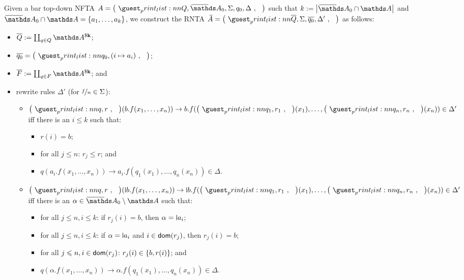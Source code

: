 \documentclass[a4paper,UKenglish,cleveref,autoref,thm-restate,numberwithinsect,final]{lipics-v2021}
\begin{document}
    \begin{construction}\label{constr:RNTA}
      \sloppypar
      Given a bar top-down NFTA $A = \maketuple{Q, \barNames_0, \Sigma, q_0, \Delta}$ such that
      ${k := \card{\barNames_0 \cap \names}}$ and $\barNames_0 \cap \names = \set{a_1, \dots, a_k}$,
      we construct the RNTA $\barA = \maketuple{\overline{Q}, \Sigma, \overline{q_0}, \Delta'}$
      as follows:
      \begin{itemize}
        \item $\overline{Q} := \coprod_{q \in Q} \parnom{k}$;
        \item $\overline{q_0} = \maketuple{q_0, (i \mapsto a_i)}$;
        \item $\overline{F} := \coprod_{q \in F} \parnom{k}$; and
        \item rewrite rules $\Delta'$ (for $\nicefrac{f}{n} \in \Sigma$):
        \begin{itemize}
          \item $\maketuple{q,r}(b.f(x_1, \dots, x_n)) \to b.f(\maketuple{q_1,r_1}(x_1),\dots,\maketuple{q_n,r_n}(x_n))
            \in \Delta'$ iff there is an $i \leqslant k$ such that:
            \begin{itemize}
              \item $r(i) = b$;\label{RNTA:cond:1:a}
              \item for all $j \leqslant n$: $r_j \leqslant r$; and\label{RNTA:cond:1:b}
              \item $q(a_i.f(x_1, \dots, x_n)) \to a_i.f(q_1(x_1), \dots, q_n(x_n)) \in \Delta$.\label{RNTA:cond:1:c}
            \end{itemize}
          \item $\maketuple{q,r}(\newletter{b}.f(x_1, \dots, x_n)) \to \newletter{b}.f(\maketuple{q_1,r_1}(x_1),\dots,
            \maketuple{q_n,r_n}(x_n)) \in \Delta'$ iff
            there is an $\alpha \in \barNames_0\setminus\names$ such that: 
            \begin{itemize}
              \item for all $j \leqslant n, i \leqslant k$: if $r_j(i) = b$, then $\alpha = \newletter{a_i}$;
                \label{RNTA:cond:2:a}
              \item for all $j \leqslant n, i \leqslant k$: if $\alpha = \newletter{a_i}$ and $i \in \operatorname{\textsf{dom}}(r_j)$, then
                $r_j(i) = b$; \label{RNTA:cond:2:b}
              \item for all $j \leqslant n, i \in \operatorname{\textsf{dom}}(r_j)$: $r_j(i) \in \{b, r(i)\}$; and\label{RNTA:cond:2:c}
              \item $q(\alpha.f(x_1, \dots, x_n)) \to \alpha.f(q_1(x_1),\dots,q_n(x_n)) \in \Delta$.
                \label{RNTA:cond:2:d}
            \end{itemize}
        \end{itemize}
      \end{itemize}
    \end{construction}
\end{document}

